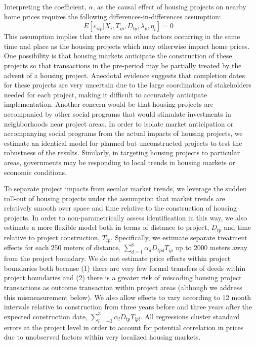 \documentclass[12pt]{article}
\begin{document}
Interpreting the coefficient, $\alpha$, as the causal effect of housing projects on nearby home prices requires the following differences-in-differences assumption:
\begin{equation*}
E[\varepsilon_{itp}|X_{i},T_{ip},D_{tp},\lambda_p,\eta_{t}]=0
\end{equation*}
This assumption implies that there are no other factors occurring in the same time and place as the housing projects which may otherwise impact home prices.  One possibility is that housing markets anticipate the construction of these projects so that transactions in the pre-period may be partially treated by the advent of a housing project.  Anecdotal evidence suggests that completion dates for these projects are very uncertain due to the large coordination of stakeholders needed for each project, making it difficult to accurately anticipate implementation.  Another concern would be that housing projects are accompanied by other social programs that would stimulate investments in neighborhoods near project areas.  In order to isolate market anticipation or accompanying social programs from the actual impacts of housing projects, we estimate an identical model for planned but unconstructed projects to test the robustness of the results.  Similarly, in targeting housing projects to particular areas, governments may be responding to local trends in housing markets or economic conditions.  

To separate project impacts from secular market trends, we leverage the sudden roll-out of housing projects under the assumption that market trends are relatively smooth over space and time relative to the construction of housing projects.  In order to non-parametrically assess identification in this way, we also estimate a more flexible model both in terms of distance to project, $D_{tp}$ and time relative to project construction, $T_{ip}$.  Specifically, we estimate separate treatment effects for each 250 meters of distance, $\sum_{d=1}^{8} \alpha_d D_{tpd} T_{ip}$ up to 2000 meters away from the project boundary.  We do not estimate price effects within project boundaries both because (1) there are very few formal transfers of deeds within project boundaries and (2) there is a greater risk of miscoding housing project transactions as outcome transaction within project areas (although we address this mismeasurement below).  We also allow effects to vary according to 12 month intervals relative to construction from three years before and three years after the expected construction date, $\sum_{l=-3}^{3} \alpha_l D_{tp}T_{ipl}$.  All regressions cluster standard errors at the project level in order to account for potential correlation in prices due to unobserved factors within very localized housing markets.  
\end{document}
